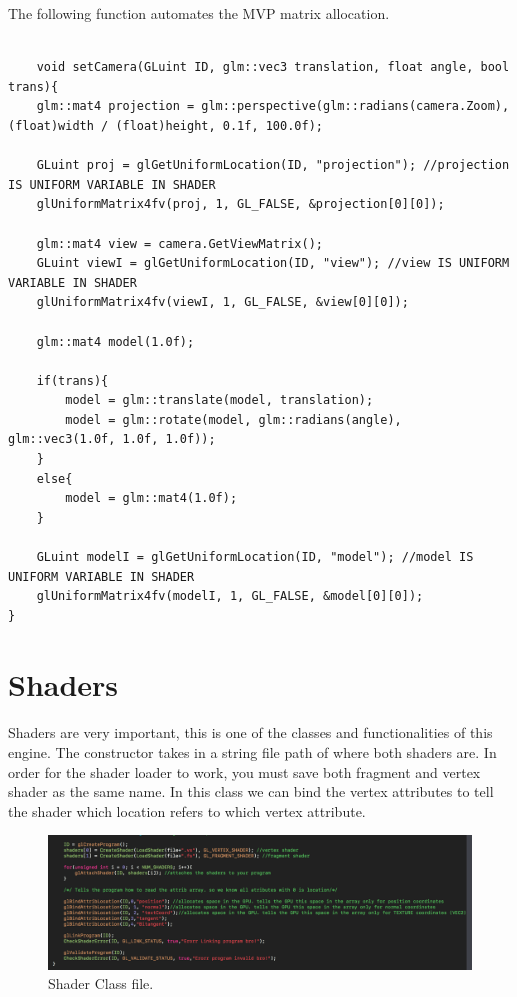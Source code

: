 \documentclass[a4paper,11pt]{article}
\begin{document}
	The following function automates the MVP matrix allocation.
		\begin{lstlisting}
		
	void setCamera(GLuint ID, glm::vec3 translation, float angle, bool trans){
	glm::mat4 projection = glm::perspective(glm::radians(camera.Zoom), (float)width / (float)height, 0.1f, 100.0f);
    
    GLuint proj = glGetUniformLocation(ID, "projection"); //projection IS UNIFORM VARIABLE IN SHADER
    glUniformMatrix4fv(proj, 1, GL_FALSE, &projection[0][0]);
    
    glm::mat4 view = camera.GetViewMatrix();
    GLuint viewI = glGetUniformLocation(ID, "view"); //view IS UNIFORM VARIABLE IN SHADER
    glUniformMatrix4fv(viewI, 1, GL_FALSE, &view[0][0]);
    
    glm::mat4 model(1.0f);
    
    if(trans){
        model = glm::translate(model, translation);
        model = glm::rotate(model, glm::radians(angle), glm::vec3(1.0f, 1.0f, 1.0f));
    }
    else{
        model = glm::mat4(1.0f);
    }
    
    GLuint modelI = glGetUniformLocation(ID, "model"); //model IS UNIFORM VARIABLE IN SHADER
    glUniformMatrix4fv(modelI, 1, GL_FALSE, &model[0][0]);
}

		\end{lstlisting}
	
		
	\section {Shaders}
	
	\paragraph{}
		Shaders are very important, this is one of the classes and functionalities of this engine. The constructor takes in a string file path of where both shaders are. In order for the shader loader to work, you must save both fragment and vertex shader as the same name. In this class we can bind the vertex attributes to tell the shader which location refers to which vertex attribute. 
		
	\begin{figure}
	\centering
	\includegraphics[scale=0.5]{bertex_shader.png}
	\caption{Shader Class file.}
	\label{shaderC}
	\end{figure}
	
\end{document}
